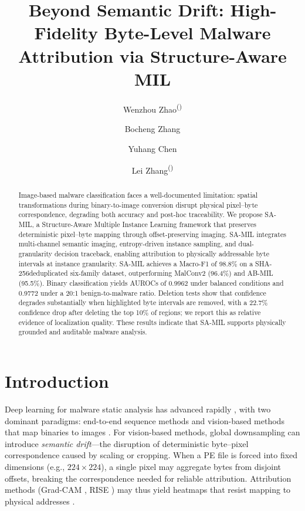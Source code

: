 \documentclass[runningheads]{llncs}
\title{Beyond Semantic Drift: High-Fidelity Byte-Level Malware Attribution via Structure-Aware MIL}
\author{Wenzhou Zhao\textsuperscript{(\Letter)} \and Bocheng Zhang \and Yuhang Chen \and Lei Zhang\textsuperscript{(\Letter)}}
\institute{Cyber Science and Engineering, Sichuan University, Chengdu, China \\
\email{zhaowenzhou@stu.scu.edu.cn, zhanglei2018@scu.edu.cn}}
\begin{document}
\maketitle

\begin{abstract}
Image-based malware classification faces a well-documented limitation:
spatial transformations during binary-to-image conversion disrupt physical
pixel--byte correspondence, degrading both accuracy and post-hoc
traceability. We propose SA-MIL, a Structure-Aware Multiple Instance
Learning framework that preserves deterministic pixel--byte mapping through
offset-preserving imaging. SA-MIL integrates multi-channel semantic
imaging, entropy-driven instance sampling, and dual-granularity decision
traceback, enabling attribution to physically addressable byte intervals at
instance granularity. SA-MIL achieves a Macro-F1 of 98.8\%
on a SHA-256\-deduplicated six-family dataset, outperforming MalConv2 (96.4\%) and AB-MIL
(95.5\%). Binary classification yields AUROCs of 0.9962 under
balanced conditions and 0.9772 under a 20:1 benign-to-malware ratio.
Deletion tests show that confidence degrades substantially when
highlighted byte intervals are removed, with a 22.7\% confidence
drop after deleting the top 10\% of regions; we report this as relative evidence
of localization quality. These results indicate that
SA-MIL supports physically grounded and auditable malware analysis.

\end{abstract}


\section{Introduction}

Deep learning for malware static analysis has advanced rapidly \cite{avtest2025}, with two dominant paradigms: end-to-end sequence methods \cite{raff2017malware} and vision-based methods that map binaries to images \cite{nataraj2011malware}. For vision-based methods, global downsampling can introduce \emph{semantic drift}---the disruption of deterministic byte--pixel correspondence caused by scaling or cropping. When a PE file is forced into fixed dimensions (e.g., $224 \times 224$), a single pixel may aggregate bytes from disjoint offsets, breaking the correspondence needed for reliable attribution. Attribution methods (Grad-CAM \cite{selvaraju2017grad}, RISE \cite{petsiuk2018rise}) may thus yield heatmaps that resist mapping to physical addresses \cite{warnecke2020evaluating,nadeem2023sok}.
\end{document}
